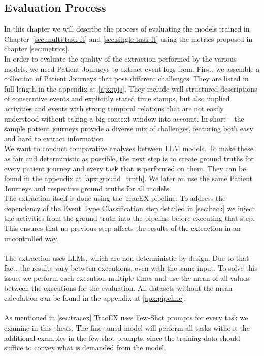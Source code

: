 \subsection{Evaluation Process}\label{sec:eval_process}
In this chapter we will describe the process of evaluating the models trained in Chapter~\ref{sec:multi-task-ft} and \ref{sec:single-task-ft} using the metrics proposed in chapter \ref{sec:metrics}.\\
In order to evaluate the quality of the extraction performed by the various models, we need Patient Journeys to extract event logs from. First, we assemble a collection of Patient Journeys that pose different challenges. They are listed in full length in the appendix at \ref{apx:pjs}. They include well-structured descriptions of consecutive events and explicitly stated time stamps, but also implied activities and events with strong temporal relations that are not easily understood without taking a big context window into account. In short – the sample patient journeys provide a diverse mix of challenges, featuring both easy and hard to extract information.\\
We want to conduct comparative analyses between LLM models. To make these as fair and deterministic as possible, the next step is to create ground truths for every patient journey and every task that is performed on them. They can be found in the appendix at \ref{apx:ground_truth}. We later on use the same Patient Journeys and respective ground truths for all models.\\
The extraction itself is done using the TracEX pipeline. To address the dependency of the Event Type Classification step detailed in \ref{sec:back} we inject the activities from the ground truth into the pipeline before executing that step. This ensures that no previous step affects the results of the extraction in an uncontrolled way.\\\\
The extraction uses LLMs, which are non-deterministic by design. Due to that fact, the results vary between executions, even with the same input. To solve this issue, we perform each execution multiple times and use the mean of all values between the executions for the evaluation. All datasets without the mean calculation can be found in the appendix at \autoref{apx:pipeline}.\\\\
As mentioned in \autoref{sec:tracex} TracEX uses Few-Shot prompts for every task we examine in this thesis. The fine-tuned model will perform all tasks without the additional examples in the few-shot prompts, since the training data should suffice to convey what is demanded from the model.

